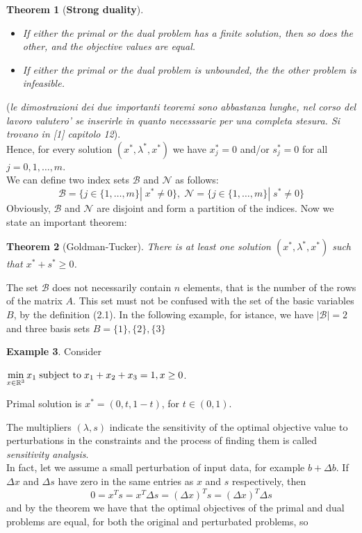 \documentclass[a4paper,10 pt,titlepage,twoside]{book}
\theoremstyle{plain}
\newtheorem{thm}{Theorem}[chapter]
\theoremstyle{definition}
\newtheorem{ex}[thm]{Example}
\theoremstyle{remark}
\begin{document}
\begin{thm}[\textbf{Strong duality}] \
\begin{itemize}
\item If either the primal or the dual problem has a finite solution, then so does the other, and the objective values are equal.
\item If either the primal or the dual problem is unbounded, the the other problem is infeasible.
\end{itemize}
\end{thm}
(\textit{le dimostrazioni dei due importanti teoremi sono abbastanza lunghe, nel corso del lavoro valutero' se inserirle in quanto necesssarie per una completa stesura. Si trovano in [1] capitolo 12}).\\
Hence, for every solution $(x^{*}, \lambda^{*}, x^{*})$ we have $x_{j}^{*}= 0$ and/or $s_{j}^{*}= 0$ for all $j=0,1,\dots,m$.\\
We can define two index sets $\mathcal{B}$ and $\mathcal{N}$ as follows:
\begin{equation}
\mathcal{B} =\{j\in\{1,\dots,m\}|\; x^{*} \not= 0\}, \;
\mathcal{N} =\{j\in\{1,\dots,m\}|\; s^{*} \not= 0\}
\end{equation}  
Obviously, $\mathcal{B}$ and $\mathcal{N}$ are disjoint and form a partition of the indices. Now we state an important theorem:
\begin{thm}[Goldman-Tucker]
	There is at least one solution $(x^{*}, \lambda^{*}, x^{*})$ such that $x^{*}+s^{*}\geq0$.
\end{thm}
The set $\mathcal{B}$ does not necessarily contain $n$ elements, that is the number of the rows of the matrix $A$. This set must not be confused with the set of the basic variables $B$, by the definition (2.1). In the following example, for istance, we have $|\mathcal{B}|= 2$ and three basis sets $B = \{1\}, \{2\}, \{3\}$
\begin{ex}
Consider
\begin{center} $\min\limits_{x\in\mathbb{R}^{3}} x_{1} \text{\;subject to\;} x_{1}+x_{2}+x_{3} = 1, x\geq 0$.\end{center}
Primal solution is $x^{*}=(0, t, 1-t)$, for $t\in(0,1)$. 	
\end{ex} 

The multipliers $(\lambda,s)$ indicate the sensitivity of the optimal objective value  to perturbations in the constraints and the process of finding them is called \textit{sensitivity analysis}. \\ In fact, let we assume a small perturbation of input data, for example $b + \Delta b$. If $\Delta x$ and $\Delta s$ have zero in the same entries as $x$ and $s$ respectively, then
\begin{equation*}
0=x^{T}s=x^{T}\Delta s= \left( \Delta x\right)^{T}s=\left( \Delta x\right)^{T}\Delta s
\end{equation*}
and by the theorem we have that the optimal objectives of the primal and dual problems are equal, for both the original and perturbated problems, so
\end{document}
